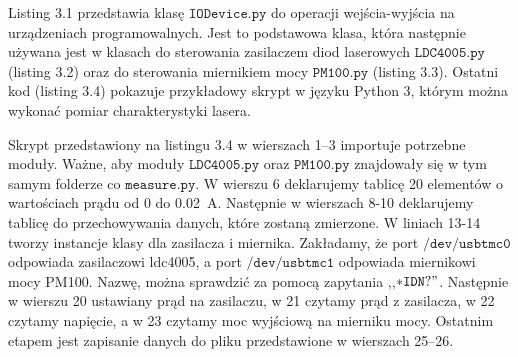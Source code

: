 Listing 3.1 przedstawia klasę $\mathtt{IODevice.py}$ do operacji  wejścia-wyjścia na urządzeniach programowalnych.
Jest to podstawowa klasa, która następnie używana jest w klasach do sterowania zasilaczem
diod laserowych $\mathtt{LDC4005.py}$ (listing 3.2) oraz do sterowania miernikiem mocy $\mathtt{PM100.py}$ (listing 3.3).
Ostatni kod (listing 3.4) pokazuje przykładowy skrypt w języku Python 3, którym można wykonać pomiar charakterystyki lasera.
\newpage



Skrypt przedstawiony na listingu 3.4 w wierszach 1--3 importuje potrzebne moduły. Ważne, aby moduły $\mathtt{LDC4005.py}$ oraz $\mathtt{PM100.py}$
znajdowały się w tym samym folderze co $\mathtt{measure.py}$.
W wierszu 6 deklarujemy tablicę 20 elementów o wartościach prądu od 0 do 0.02 \,A. Następnie w wierszach 8-10 deklarujemy
tablicę do przechowywania danych, które zostaną zmierzone.
W liniach 13-14 tworzy instancje klasy dla zasilacza i miernika. Zakładamy, że port $\mathtt{/dev/usbtmc0}$ odpowiada zasilaczowi ldc4005,
a port $\mathtt{/dev/usbtmc1}$ odpowiada miernikowi mocy PM100. Nazwę, można sprawdzić za pomocą zapytania  ,,$\mathtt{*IDN?}"$.
Następnie w wierszu 20 ustawiany prąd na zasilaczu, w 21 czytamy prąd z zasilacza, w 22 czytamy napięcie, a w 23 czytamy moc wyjściową na mierniku mocy.
Ostatnim etapem jest zapisanie danych do pliku  przedstawione w wierszach 25--26.

